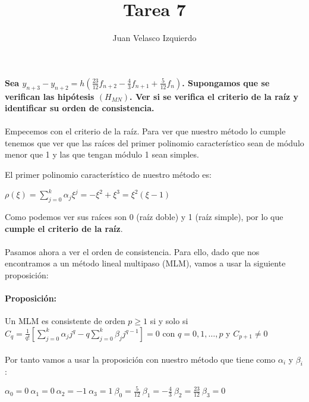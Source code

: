 \documentclass[titlepage]{article}
\title{Tarea 7}
\author{Juan Velasco Izquierdo}
\begin{document}
\maketitle

\paragraph{} \textbf{Sea $y_{n+3} - y_{n+2} = h(\frac{23}{12}f_{n+2} - \frac{4}{3}f_{n+1} + \frac{5}{12}f_{n})$. Supongamos que se verifican las hipótesis $(H_{MN})$. Ver si se verifica el criterio de la raíz y identificar su orden de consistencia.}
\
\paragraph{}Empecemos con el criterio de la raíz. Para ver que nuestro método lo cumple tenemos que ver que las raíces del primer polinomio característico sean de módulo menor que 1 y las que tengan módulo 1 sean simples.

El primer polinomio característico de nuestro método es:

$\rho(\xi) = \sum_{j=0}^k\alpha_j \xi^j = -\xi^2 + \xi^3 = \xi^2(\xi-1)$

Como podemos ver sus raíces son 0 (raíz doble) y 1 (raíz simple), por lo que \textbf{cumple el criterio de la raíz}.
\
\paragraph{}Pasamos ahora a ver el orden de consistencia. Para ello, dado que nos encontramos a un método lineal multipaso (MLM), vamos a usar la siguiente proposición:

\paragraph{Proposición:}Un MLM es consistente de orden $p\geq 1$ si y solo si
$C_q=\frac{1}{q!}[\sum_{j=0}^{k}\alpha_{j}j^{q}-q\sum_{j=0}^{k}\beta_{j}j^{q-1}]=0$ con $q=0,1,\ldots,p$ y $C_{p+1} \neq 0$

\paragraph{}Por tanto vamos a usar la proposición con nuestro método que tiene como $\alpha_i$ y $\beta_i$:

$\alpha_0=0 \ \alpha_1=0 \ \alpha_2=-1 \ \alpha_3=1 \ \beta_0=\frac{5}{12} \ \beta_1=-\frac{4}{3} \ \beta_2=\frac{23}{12} \ \beta_3=0 \ $
\end{document}
